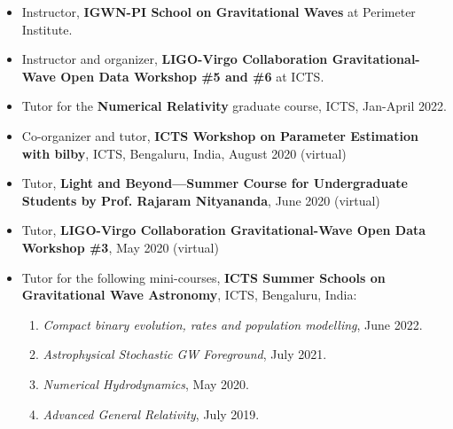 		\begin{itemize}[leftmargin=*]
		
			\item Instructor, \textbf{IGWN-PI School on Gravitational Waves} at Perimeter Institute.
			\item Instructor and organizer, \textbf{LIGO-Virgo Collaboration Gravitational-Wave Open Data Workshop \#5 and \#6} at ICTS.
			\item Tutor for the \textbf{Numerical Relativity} graduate course, ICTS, Jan-April 2022.
			\item Co-organizer and tutor, \textbf{ICTS Workshop on Parameter Estimation with bilby}, ICTS, Bengaluru, India, August 2020 (virtual)
			\item Tutor, \textbf{Light and Beyond---Summer Course for Undergraduate Students by Prof. Rajaram Nityananda}, June 2020 (virtual)
			\item Tutor, \textbf{LIGO-Virgo Collaboration Gravitational-Wave Open Data Workshop \#3}, May 2020 (virtual)
			\item Tutor for the following mini-courses, \textbf{ICTS Summer Schools on Gravitational Wave Astronomy}, ICTS, Bengaluru, India:
			\begin{enumerate}
				\item \textit{Compact binary evolution, rates and population modelling}, June 2022.
				\item \textit{Astrophysical Stochastic GW Foreground}, July 2021.
				\item \textit{Numerical Hydrodynamics}, May 2020.
				\item \textit{Advanced General Relativity}, July 2019.
			\end{enumerate}
			
		\end{itemize}
		
		


